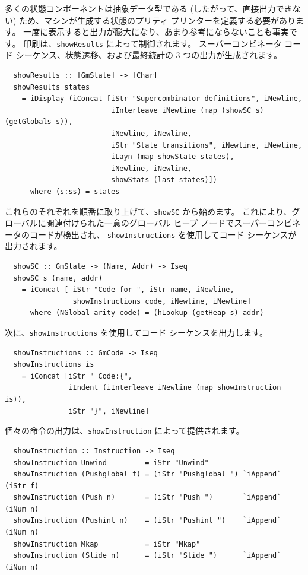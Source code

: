 \documentclass{jbook}
\begin{document}
多くの状態コンポーネントは抽象データ型である (したがって、直接出力できない) ため、マシンが生成する状態のプリティ プリンターを定義する必要があります。
一度に表示すると出力が膨大になり、あまり参考にならないことも事実です。
印刷は、\texttt{showResults} によって制御されます。
スーパーコンビネータ コード シーケンス、状態遷移、および最終統計の 3 つの出力が生成されます。

\begin{verbatim}
  showResults :: [GmState] -> [Char]
  showResults states
    = iDisplay (iConcat [iStr "Supercombinator definitions", iNewline,
                         iInterleave iNewline (map (showSC s) (getGlobals s)),
                         iNewline, iNewline,
                         iStr "State transitions", iNewline, iNewline,
                         iLayn (map showState states),
                         iNewline, iNewline,
                         showStats (last states)])
      where (s:ss) = states
\end{verbatim}

これらのそれぞれを順番に取り上げて、\texttt{showSC} から始めます。
これにより、グローバルに関連付けられた一意のグローバル ヒープ ノードでスーパーコンビネータのコードが検出され、
\texttt{showInstructions} を使用してコード シーケンスが出力されます。

\begin{verbatim}
  showSC :: GmState -> (Name, Addr) -> Iseq
  showSC s (name, addr)
    = iConcat [ iStr "Code for ", iStr name, iNewline,
                showInstructions code, iNewline, iNewline]
      where (NGlobal arity code) = (hLookup (getHeap s) addr)
\end{verbatim}

次に、\texttt{showInstructions} を使用してコード シーケンスを出力します。

\begin{verbatim}
  showInstructions :: GmCode -> Iseq
  showInstructions is
    = iConcat [iStr " Code:{",
               iIndent (iInterleave iNewline (map showInstruction is)),
               iStr "}", iNewline]
\end{verbatim}

個々の命令の出力は、\texttt{showInstruction} によって提供されます。

\begin{verbatim}
  showInstruction :: Instruction -> Iseq
  showInstruction Unwind         = iStr "Unwind"
  showInstruction (Pushglobal f) = (iStr "Pushglobal ") `iAppend` (iStr f)
  showInstruction (Push n)       = (iStr "Push ")       `iAppend` (iNum n)
  showInstruction (Pushint n)    = (iStr "Pushint ")    `iAppend` (iNum n)
  showInstruction Mkap           = iStr "Mkap"
  showInstruction (Slide n)      = (iStr "Slide ")      `iAppend` (iNum n)
\end{verbatim}
\end{document}
